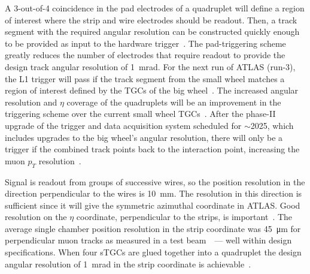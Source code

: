 A 3-out-of-4 coincidence in the pad electrodes of a quadruplet will define a region of interest where the strip and wire electrodes should be readout. Then, a track segment with the required angular resolution can be constructed quickly enough to be provided as input to the hardware trigger~\cite{nsw_tdr}. The pad-triggering scheme greatly reduces the number of electrodes that require readout to provide the design track angular resolution of \SI{1}{mrad}. For the next run of ATLAS (run-3), the L1 trigger will pass if the track segment from the small wheel matches a region of interest defined by the TGCs of the big wheel~\cite{tdaq_phase1_tdr, nsw_tdr}. The increased angular resolution and $\eta$ coverage of the quadruplets will be an improvement in the triggering scheme over the current small wheel TGCs~\cite{nsw_tdr}. After the phase-II upgrade of the trigger and data acquisition system scheduled for $\sim$2025, which includes upgrades to the big wheel's angular resolution, there will only be a trigger if the combined track points back to the interaction point, increasing the muon $p_T$ resolution~\cite{nsw_tdr, tdaq_phase2_tdr}. 

Signal is readout from groups of successive wires, so the position resolution in the direction perpendicular to the wires is \SI{10}{mm}. The resolution in this direction is sufficient since it will give the symmetric azimuthal coordinate in ATLAS. Good resolution on the $\eta$ coordinate, perpendicular to the strips, is important~\cite{nsw_tdr}. The average single chamber position resolution in the strip coordinate was \SI{45}{\micro\meter} for perpendicular muon tracks as measured in a test beam~\cite{abusleme_performance_2016}~--- well within design specifications. When four sTGCs are glued together into a quadruplet the design angular resolution of \SI{1}{mrad} in the strip coordinate is achievable~\cite{nsw_tdr, perez-codina_small-strip_2016}. 

